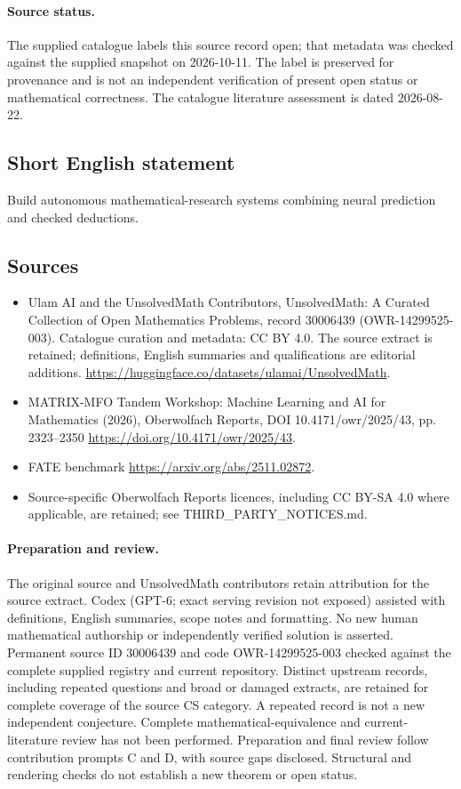 \documentclass[11pt]{article}
\begin{document}
\paragraph{Source status.}
The supplied catalogue labels this source record open; that metadata was checked against the supplied snapshot on 2026-10-11. The label is preserved for provenance and is not an independent verification of present open status or mathematical correctness. The catalogue literature assessment is dated 2026-08-22.
\subsection{Short English statement}
Build autonomous mathematical-research systems combining neural prediction and checked deductions.
\subsection{Sources}
\begin{itemize}
\item[\hypertarget{source:30006439:1}{S1}] Ulam AI and the UnsolvedMath Contributors, UnsolvedMath: A Curated Collection of Open Mathematics Problems, record 30006439 (OWR-14299525-003). Catalogue curation and metadata: CC BY 4.0. The source extract is retained; definitions, English summaries and qualifications are editorial additions.
\url{https://huggingface.co/datasets/ulamai/UnsolvedMath}.
\item[\hypertarget{source:30006439:2}{S2}] MATRIX-MFO Tandem Workshop: Machine Learning and AI for Mathematics (2026), Oberwolfach Reports, DOI 10.4171/owr/2025/43, pp. 2323--2350
\url{https://doi.org/10.4171/owr/2025/43}.
\item[\hypertarget{source:30006439:3}{S3}] FATE benchmark
\url{https://arxiv.org/abs/2511.02872}.
\item Source-specific Oberwolfach Reports licences, including CC BY-SA 4.0 where applicable, are retained; see THIRD\_PARTY\_NOTICES.md.
\end{itemize}
\paragraph{Preparation and review.}
The original source and UnsolvedMath contributors retain attribution for the source extract. Codex (GPT-6; exact serving revision not exposed) assisted with definitions, English summaries, scope notes and formatting. No new human mathematical authorship or independently verified solution is asserted. Permanent source ID 30006439 and code OWR-14299525-003 checked against the complete supplied registry and current repository. Distinct upstream records, including repeated questions and broad or damaged extracts, are retained for complete coverage of the source CS category. A repeated record is not a new independent conjecture. Complete mathematical-equivalence and current-literature review has not been performed. Preparation and final review follow contribution prompts C and D, with source gaps disclosed. Structural and rendering checks do not establish a new theorem or open status.
\label{end:30006439}
\end{document}
